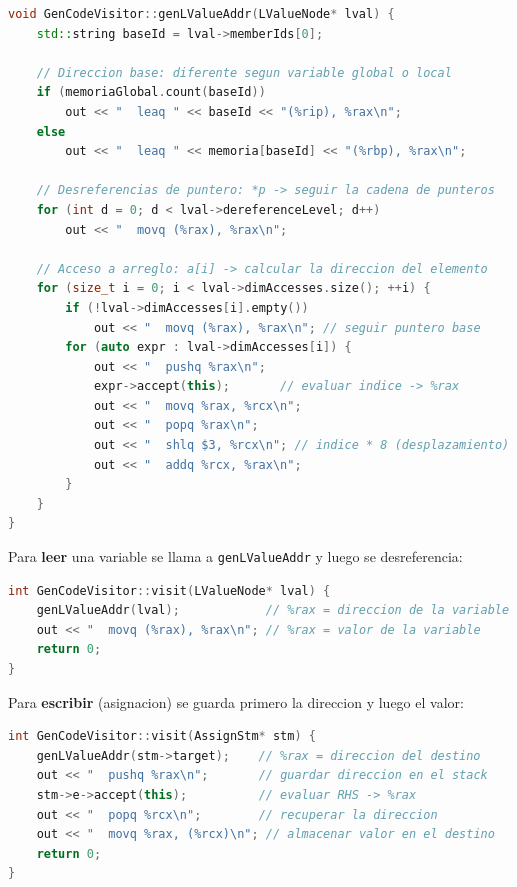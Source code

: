 \documentclass[12pt, a4paper]{article}
\begin{document}
\begin{lstlisting}[language=C++, style=cppstyle, caption={Helper genLValueAddr}]
void GenCodeVisitor::genLValueAddr(LValueNode* lval) {
    std::string baseId = lval->memberIds[0];

    // Direccion base: diferente segun variable global o local
    if (memoriaGlobal.count(baseId))
        out << "  leaq " << baseId << "(%rip), %rax\n";
    else
        out << "  leaq " << memoria[baseId] << "(%rbp), %rax\n";

    // Desreferencias de puntero: *p -> seguir la cadena de punteros
    for (int d = 0; d < lval->dereferenceLevel; d++)
        out << "  movq (%rax), %rax\n";

    // Acceso a arreglo: a[i] -> calcular la direccion del elemento
    for (size_t i = 0; i < lval->dimAccesses.size(); ++i) {
        if (!lval->dimAccesses[i].empty())
            out << "  movq (%rax), %rax\n"; // seguir puntero base
        for (auto expr : lval->dimAccesses[i]) {
            out << "  pushq %rax\n";
            expr->accept(this);       // evaluar indice -> %rax
            out << "  movq %rax, %rcx\n";
            out << "  popq %rax\n";
            out << "  shlq $3, %rcx\n"; // indice * 8 (desplazamiento)
            out << "  addq %rcx, %rax\n";
        }
    }
}
\end{lstlisting}

Para \textbf{leer} una variable se llama a \texttt{genLValueAddr} y luego se desreferencia:

\begin{lstlisting}[language=C++, style=cppstyle, caption={Lectura de una variable (LValueNode como expresion)}]
int GenCodeVisitor::visit(LValueNode* lval) {
    genLValueAddr(lval);            // %rax = direccion de la variable
    out << "  movq (%rax), %rax\n"; // %rax = valor de la variable
    return 0;
}
\end{lstlisting}

Para \textbf{escribir} (asignacion) se guarda primero la direccion y luego el valor:

\begin{lstlisting}[language=C++, style=cppstyle, caption={Asignacion (AssignStm)}]
int GenCodeVisitor::visit(AssignStm* stm) {
    genLValueAddr(stm->target);    // %rax = direccion del destino
    out << "  pushq %rax\n";       // guardar direccion en el stack
    stm->e->accept(this);          // evaluar RHS -> %rax
    out << "  popq %rcx\n";        // recuperar la direccion
    out << "  movq %rax, (%rcx)\n"; // almacenar valor en el destino
    return 0;
}
\end{lstlisting}
\end{document}
